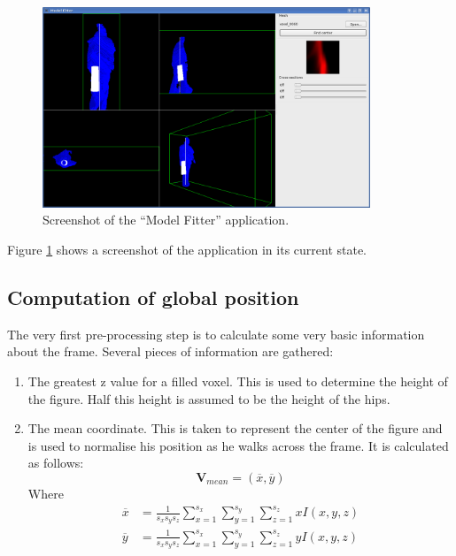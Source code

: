 \begin{figure}[tb]
	\centering
	\includegraphics[height=6cm]{../interim/screenshot.png}
	\caption{Screenshot of the ``Model Fitter'' application.}
	\label{Screenshot}
\end{figure}

Figure \ref{Screenshot} shows a screenshot of the application in its current state.


\subsection{Computation of global position}\label{LocatingCenter}

The very first pre-processing step is to calculate some very basic information about the frame.
Several pieces of information are gathered:

\begin{enumerate}
	\item The greatest z value for a filled voxel.
		This is used to determine the height of the figure.
		Half this height is assumed to be the height of the hips.
	\item The mean coordinate.
		This is taken to represent the center of the figure and is used to normalise his position as he walks across the frame.
		It is calculated as follows:
		\begin{equation}
			\mathbf{V}_{mean} = (\overline{x}, \overline{y})
		\end{equation}
		Where
		\begin{align}
			\overline{x} &= \frac{1}{s_x s_y s_z} \sum_{x=1}^{s_x} \sum_{y=1}^{s_y} \sum_{z=1}^{s_z} x I(x,y,z) \\
			\overline{y} &= \frac{1}{s_x s_y s_z} \sum_{x=1}^{s_x} \sum_{y=1}^{s_y} \sum_{z=1}^{s_z} y I(x,y,z)
		\end{align}

\end{enumerate}


